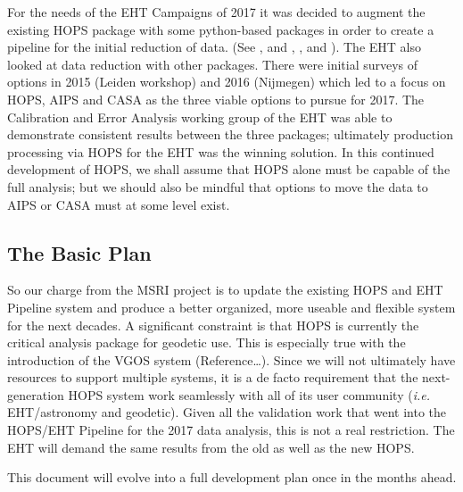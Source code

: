 For the needs of the EHT Campaigns of 2017 it was decided to augment
the existing HOPS package with some python-based packages in order to
create a pipeline for the initial reduction of data.  (See
\cite{blackburn2019eht}, and \cite{eht1}, \cite{eht2}, and \cite{eht3}).
The EHT also looked at data reduction with
other packages.  There were initial surveys of options in 2015 (Leiden
workshop) and 2016 (Nijmegen) which led to a focus on HOPS, AIPS and CASA
as the three viable options to pursue for 2017.
The Calibration and Error Analysis working group
of the EHT was able to demonstrate consistent results between the three
packages; ultimately production processing via HOPS for the EHT was the
winning solution.  In this continued development of HOPS, we shall assume
that HOPS alone must be capable of the full analysis; but we should also
be mindful that options to move the data to AIPS or CASA must at some
level exist.

\subsection{The Basic Plan}
\label{sec:theplanstan}

So our charge from the MSRI project is to update the existing HOPS and
EHT Pipeline system and produce a better organized, more useable and
flexible system for the next decades.  A significant constraint is that
HOPS is currently the critical analysis package for geodetic use.  This
is especially true with the introduction of the VGOS system
(Reference\dots).  Since we will not ultimately have resources to support
multiple systems, it is a de facto requirement that the next-generation
HOPS system work seamlessly with all of its user community (\textit{i.e.}
EHT/astronomy and geodetic).  Given all the validation work that went
into the HOPS/EHT Pipeline for the 2017 data analysis, this is not a
real restriction.  The EHT will demand the same results from the old
as well as the new HOPS.

This document will evolve into a full development plan once in the
months ahead.

%
%
